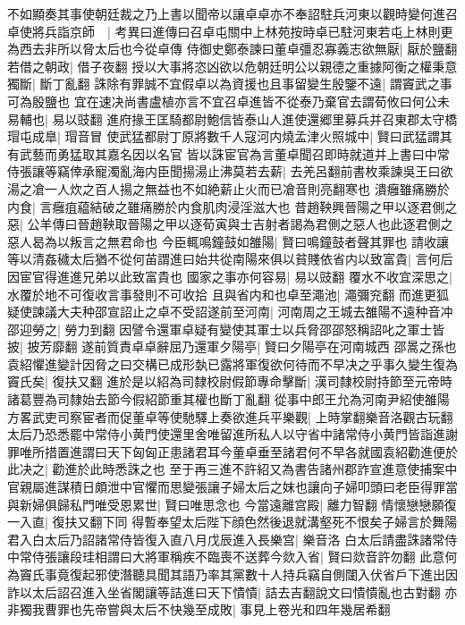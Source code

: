 不如顯奏其事使朝廷裁之乃上書以聞帝以讓卓卓亦不奉詔駐兵河東以觀時變何進召卓使將兵詣京師　|{
	考異曰進傳曰召卓屯關中上林苑按時卓已駐河東若屯上林則更為西去非所以脅太后也今從卓傳}
侍御史鄭泰諫曰董卓彊忍寡義志欲無厭|{
	厭於鹽翻}
若借之朝政|{
	借子夜翻}
授以大事將恣凶欲以危朝廷明公以親德之重據阿衡之權秉意獨斷|{
	斷丁亂翻}
誅除有罪誠不宜假卓以為資援也且事留變生殷鑒不遠|{
	謂竇武之事可為殷鹽也}
宜在速决尚書盧植亦言不宜召卓進皆不從泰乃棄官去謂荀攸曰何公未易輔也|{
	易以豉翻}
進府掾王匡騎都尉鮑信皆泰山人進使還郷里募兵并召東郡太守橋瑁屯成臯|{
	瑁音冒}
使武猛都尉丁原將數千人寇河内燒孟津火照城中|{
	賢曰武猛謂其有武藝而勇猛取其嘉名因以名官}
皆以誅宦官為言董卓聞召即時就道并上書曰中常侍張讓等竊倖承寵濁亂海内臣聞揚湯止沸莫若去薪|{
	去羌呂翻前書枚乘諫吳王曰欲湯之凔一人炊之百人揚之無益也不如絶薪止火而已凔音則亮翻寒也}
潰癰雖痛勝於内食|{
	言癰疽藴結破之雖痛勝於内食肌肉浸淫滋大也}
昔趙鞅興晉陽之甲以逐君側之惡|{
	公羊傳曰晉趙鞅取晉陽之甲以逐荀寅與士吉射者謁為君側之惡人也此逐君側之惡人曷為以叛言之無君命也}
今臣輒鳴鐘鼓如雒陽|{
	賢曰鳴鐘鼓者聲其罪也}
請收讓等以清姦穢太后猶不從何苖謂進曰始共從南陽來俱以貧賤依省内以致富貴|{
	言何后因宦官得進進兄弟以此致富貴也}
國家之事亦何容易|{
	易以豉翻}
覆水不收宜深思之|{
	水覆於地不可復收言事發則不可收拾}
且與省内和也卓至澠池|{
	澠彌兖翻}
而進更狐疑使諫議大夫种邵宣詔止之卓不受詔遂前至河南|{
	河南周之王城去雒陽不遠种音冲}
邵迎勞之|{
	勞力到翻}
因譬令還軍卓疑有變使其軍士以兵脅邵邵怒稱詔叱之軍士皆披|{
	披芳靡翻}
遂前質責卓卓辭屈乃還軍夕陽亭|{
	賢曰夕陽亭在河南城西}
邵暠之孫也袁紹懼進變計因脅之曰交構已成形埶已露將軍復欲何待而不早决之乎事久變生復為竇氏矣|{
	復扶又翻}
進於是以紹為司隸校尉假節專命擊斷|{
	漢司隸校尉持節至元帝時諸葛豐為司隸始去節今假紹節重其權也斷丁亂翻}
從事中郎王允為河南尹紹使雒陽方畧武吏司察宦者而促董卓等使馳驛上奏欲進兵平樂觀|{
	上時掌翻樂音洛觀古玩翻}
太后乃恐悉罷中常侍小黄門使還里舍唯留進所私人以守省中諸常侍小黄門皆詣進謝罪唯所措置進謂曰天下匈匈正患諸君耳今董卓垂至諸君何不早各就國袁紹勸進便於此决之|{
	勸進於此時悉誅之也}
至于再三進不許紹又為書告諸州郡詐宣進意使捕案中官親屬進謀積日頗泄中官懼而思變張讓子婦太后之妺也讓向子婦叩頭曰老臣得罪當與新婦俱歸私門唯受恩累世|{
	賢曰唯思念也}
今當遠離宫殿|{
	離力智翻}
情懷戀戀願復一入直|{
	復扶又翻下同}
得暫奉望太后陛下顔色然後退就溝壑死不恨矣子婦言於舞陽君入白太后乃詔諸常侍皆復入直八月戊辰進入長樂宫|{
	樂音洛}
白太后請盡誅諸常侍中常侍張讓段珪相謂曰大將軍稱疾不臨喪不送葬今欻入省|{
	賢曰欻音許勿翻}
此意何為竇氏事竟復起邪使潛聽具聞其語乃率其黨數十人持兵竊自側闥入伏省戶下進出因詐以太后詔召進入坐省閣讓等詰進曰天下憒憒|{
	詰去吉翻說文曰憒憒亂也古對翻}
亦非獨我曹罪也先帝嘗與太后不快幾至成敗|{
	事見上卷光和四年幾居希翻}
